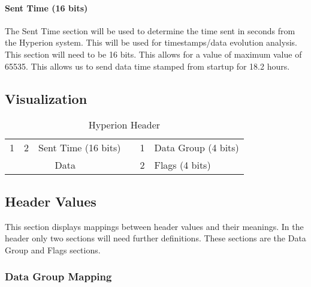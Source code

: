 \documentclass{article}
\begin{document}
  \paragraph{Sent Time (16 bits)}
  The Sent Time section will be used to determine the time sent in seconds from the Hyperion system. This will be used for timestamps/data evolution analysis. This section will need to be 16 bits. This allows for a value of maximum value of 65535. This allows us to send data time stamped from startup for 18.2 hours. 
  
  \subsection{Visualization}
  
  \begin{table}[h]
  \centering
  \caption{Hyperion Header}
  \label{Hyperion Header}
  \begin{tabular}{|c|c|c|l|l|l|l|l|l|l|lll}
  \cline{1-10}
  1 & 2 & \multicolumn{8}{c|}{Sent Time (16 bits)} &  & 1 & Data Group (4 bits) \\ \cline{1-10}
  \multicolumn{10}{|c|}{Data}                      &  & 2 & Flags (4 bits)      \\ \cline{1-10}
  \end{tabular}
  \end{table}
  
  \subsection{Header Values}
  This section displays mappings between header values and their meanings. In the header only two sections will need further definitions. These sections are the Data Group and Flags sections.
  
  \subsubsection{Data Group Mapping}
  
\end{document}

